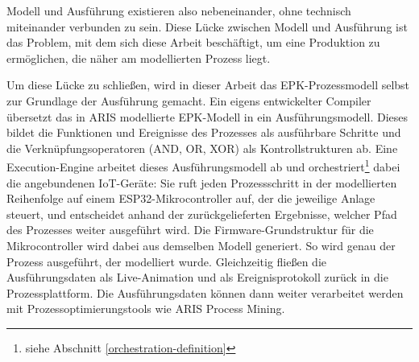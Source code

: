 \noindent Modell und Ausführung existieren also nebeneinander, ohne technisch miteinander verbunden zu sein. 
Diese Lücke zwischen Modell und Ausführung ist das Problem, mit dem sich diese Arbeit beschäftigt, um eine 
Produktion zu ermöglichen, die näher am modellierten Prozess liegt.

\noindent Um diese Lücke zu schließen, wird in dieser Arbeit das EPK-Prozessmodell selbst zur Grundlage 
der Ausführung gemacht. Ein eigens entwickelter Compiler übersetzt das in ARIS modellierte 
EPK-Modell in ein Ausführungsmodell. Dieses bildet die Funktionen und Ereignisse des Prozesses 
als ausführbare Schritte und die Verknüpfungsoperatoren (AND, OR, XOR) als Kontrollstrukturen 
ab. Eine Execution-Engine arbeitet dieses Ausführungsmodell ab und orchestriert\footnote{siehe Abschnitt \ref{orchestration-definition}} dabei die 
angebundenen IoT-Geräte: Sie ruft jeden Prozessschritt in der modellierten Reihenfolge auf 
einem ESP32-Mikrocontroller auf, der die jeweilige Anlage steuert, und entscheidet anhand der 
zurückgelieferten Ergebnisse, welcher Pfad des Prozesses weiter ausgeführt wird. Die 
Firmware-Grundstruktur für die Mikrocontroller wird dabei aus demselben Modell generiert. So 
wird genau der Prozess ausgeführt, der modelliert wurde. Gleichzeitig fließen die 
Ausführungsdaten als Live-Animation und als Ereignisprotokoll zurück in die Prozessplattform. Die 
Ausführungsdaten können dann weiter verarbeitet werden mit Prozessoptimierungstools wie ARIS 
Process Mining.

